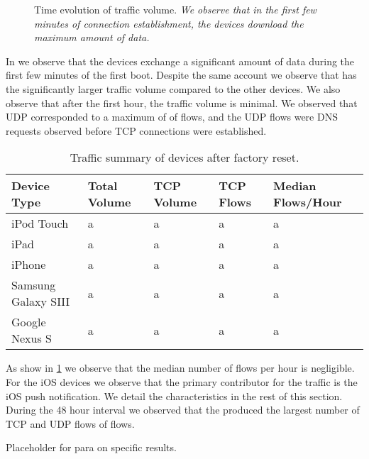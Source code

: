 \begin{figure}
\caption{Time evolution of traffic volume. \emph{We observe that in the first few minutes of connection establishment, the devices download the maximum amount of data.}} 
\label{fig:time-evol-factory-reset}
\end{figure}

In  we observe that the devices exchange a significant amount of data during the first few minutes of the first boot. 
Despite the same account we observe that  has the significantly larger traffic volume compared to the other devices. 
We also observe that after the first hour, the traffic volume is minimal. 
We observed that UDP corresponded to a maximum of  of flows, and the  UDP flows were DNS requests observed before TCP connections were established. 

\begin{table}
\begin{small}
\begin{tabular}{|p{}|p{}|p{}|p{}|p{}|}
\hline
{\bf Device Type} & {\bf Total Volume} & {\bf TCP Volume} & {\bf TCP Flows} & {\bf Median Flows/Hour} \tabularnewline
\hline
iPod Touch & a & a & a & a \tabularnewline
\hline
iPad & a & a & a & a  \tabularnewline
\hline
iPhone & a & a & a & a \tabularnewline
\hline
Samsung Galaxy SIII & a & a & a & a \tabularnewline
\hline
Google Nexus S & a & a & a & a \tabularnewline
\hline
\end{tabular}
\end{small}
\caption{Traffic summary of devices after factory reset.}
\label{tab:factory-reset}
\end{table}

As show in \ref{tab:factory-reset} we observe that the median number of flows per hour is negligible. 
For the iOS devices we observe that the primary contributor for the traffic is the iOS push notification. 
We detail the characteristics in the rest of this section. 
During the 48 hour interval we observed that the  produced the largest number of TCP and UDP flows  of flows.

Placeholder for para on specific results.


